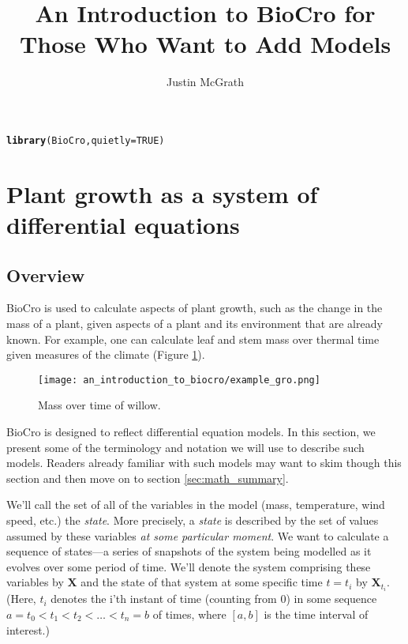 \documentclass{article}\usepackage[]{graphicx}\usepackage[]{color}
\title{An Introduction to BioCro for Those Who Want to Add Models}
\author{Justin McGrath}
\makeatletter
\newcommand{\hlnum}[1]{\textcolor[rgb]{0.686,0.059,0.569}{#1}}%
\newcommand{\hlstd}[1]{\textcolor[rgb]{0.345,0.345,0.345}{#1}}%
\newcommand{\hlkwc}[1]{\textcolor[rgb]{0.333,0.667,0.333}{#1}}%
\newcommand{\hlkwd}[1]{\textcolor[rgb]{0.737,0.353,0.396}{\textbf{#1}}}%
\newenvironment{kframe}{%
 \def\at@end@of@kframe{}%
 \ifinner\ifhmode%
  \def\at@end@of@kframe{\end{minipage}}%
  \begin{minipage}{\columnwidth}%
 \fi\fi%
 \def\FrameCommand##1{\hskip\@totalleftmargin \hskip-\fboxsep
 \colorbox{shadecolor}{##1}\hskip-\fboxsep
     \hskip-\linewidth \hskip-\@totalleftmargin \hskip\columnwidth}%
 \MakeFramed {\advance\hsize-\width
   \@totalleftmargin\z@ \linewidth\hsize
   \@setminipage}}%
 {\par\unskip\endMakeFramed%
 \at@end@of@kframe}
\newenvironment{knitrout}{}{} %
\newcommand{\boldX}{\mathbf{X}}
\makeatother
\begin{document}
\maketitle

\tableofcontents


\begin{knitrout}
\color{fgcolor}\begin{kframe}
\begin{alltt}
\hlkwd{library}\hlstd{(BioCro,} \hlkwc{quietly}\hlstd{=}\hlnum{TRUE}\hlstd{)}
\end{alltt}


{\ttfamily\noindent\bfseries\color{errorcolor}{\#\# Error in library(BioCro, quietly = TRUE): there is no package called 'BioCro'}}\end{kframe}
\end{knitrout}

\section{Plant growth as a system of differential equations}
\subsection{Overview}

BioCro is used to calculate aspects of plant growth, such as the
change in the mass of a plant, given aspects of a plant and its
environment that are already known. For example, one can calculate
leaf and stem mass over thermal time given measures of the climate
(Figure \ref{fig:example}).

\begin{figure}[!h]
\centering
\texttt{[image: an\_introduction\_to\_biocro/example\_gro.png]}
\caption{\label{fig:example}Mass over time of willow.}
\end{figure}

BioCro is designed to reflect differential equation models. In this
section, we present some of the terminology and notation we will use
to describe such models.  Readers already familiar with such models
may want to skim though this section and then move on to section
\ref{sec:math_summary}.

We'll call the set of all of the variables in the model (mass,
temperature, wind speed, etc.) the \emph{state}. More precisely, a
\emph{state} is described by the set of values assumed by these
variables \emph{at some particular moment}.  We want to calculate a
sequence of states---a series of snapshots of the system being modelled
as it evolves over some period of time.  We'll denote the system
comprising these variables by $\boldX$ and the state of that system at
some specific time $t = t_i$ by $\boldX_{t_i}$.  (Here, $t_i$ denotes
the i'th instant of time (counting from 0) in some sequence $a = t_0 <
t_1 < t_2 < \dots < t_n = b$ of times, where $[a, b]$ is the time
interval of interest.)
\end{document}
